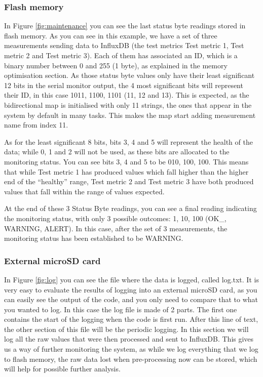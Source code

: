 \documentclass[12pt]{article}
\begin{document}
\subsubsection{Flash memory}

In Figure \ref{fig:maintenance} you can see the last status byte readings stored in flash memory. As you can see in this example, we have a set of three measurements sending data to InfluxDB (the test metrics Test metric 1, Test metric 2 and Test metric 3). Each of them has associated an ID, which is a binary number between 0 and 255 (1 byte), as explained in the memory optimisation section. As those status byte values only have their least significant 12 bits in the serial monitor output, the 4 most significant bits will represent their ID, in this case 1011, 1100, 1101 (11, 12 and 13). This is expected, as the bidirectional map is initialised with only 11 strings, the ones that appear in the system by default in many tasks. This makes the map start adding measurement name from index 11.\par 

As for the least significant 8 bits, bits 3, 4 and 5 will represent the health of the data; while 0, 1 and 2 will not be used, as these bits are allocated to the monitoring status. You can see bits 3, 4 and 5 to be 010, 100, 100. This means that while Test metric 1 has produced values which fall higher than the higher end of the ``healthy'' range, Test metric 2 and Test metric 3 have both produced values that fall within the range of values expected.\par

At the end of these 3 Status Byte readings, you can see a final reading indicating the monitoring status, with only 3 possible outcomes: 1, 10, 100 (OK\_, WARNING, ALERT). In this case, after the set of 3 measurements, the monitoring status has been established to be WARNING.\par

\subsubsection{External microSD card}

In Figure \ref{fig:log} you can see the file where the data is logged, called log.txt. It is very easy to evaluate the results of logging into an external microSD card, as you can easily see the output of the code, and you only need to compare that to what you wanted to log. In this case the log file is made of 2 parts. The first one contains the start of the logging when the code is first run. After this line of text, the other section of this file will be the periodic logging. In this section we will log all the raw values that were then processed and sent to InfluxDB. This gives us a way of further monitoring the system, as while we log everything that we log to flash memory, the raw data lost when pre-processing now can be stored, which will help for possible further analysis.
\end{document}
